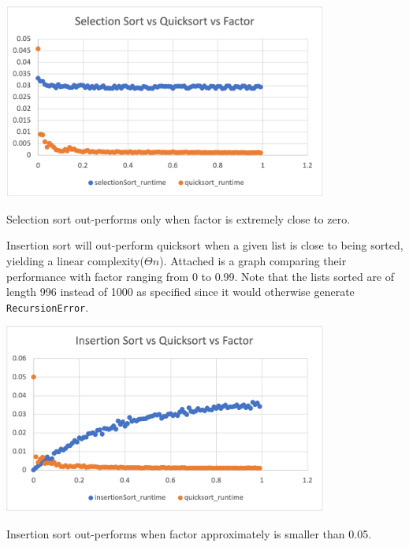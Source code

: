 \documentclass{article}
\begin{document}
\includegraphics[width=0.8\textwidth]{selectionSort_vs_quicksort_vs_factor}

Selection sort out-performs only when factor is extremely close to zero.

\medskip
Insertion sort will out-perform quicksort when a given list is close to being sorted, 
yielding a linear complexity($\Theta{n}$). Attached is a graph comparing their 
performance with factor ranging from 0 to 0.99. Note that the lists sorted are of 
length 996 instead of 1000 as specified since it would otherwise generate \verb|RecursionError|.

\includegraphics[width=0.8\textwidth]{insertionSort_vs_quicksort_vs_factor}

Insertion sort out-performs when factor approximately is smaller than 0.05.
\end{document}
